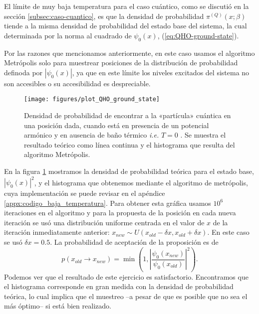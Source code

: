\documentclass[%
 reprint,
 amsmath,amssymb,
 aps,
 pra,
]{revtex4-2}
\begin{document}
El límite de muy baja temperatura para el caso cuántico, como se discutió en la sección \ref{subsec:caso-cuantico}, es que la densidad de probabilidad $\pi^{(Q)}(x;\beta)$ tiende a la misma densidad de probabilidad del estado base del sistema, la cual determinada por la norma al cuadrado de $\psi_0(x)$, (\ref{eq:QHO-ground-state}).

Por las razones que mencionamos anteriormente, en este caso usamos el algoritmo Metrópolis solo para muestrear posiciones de la distribución de probabilidad definoda por $|\psi_0(x)|$, ya que en este límite los niveles excitados del sistema no son accesibles o su accesibilidad es despreciable. 

\begin{figure}[!t]
	\centering
	\texttt{[image: figures/plot\_QHO\_ground\_state]}
	\caption{Densidad de probabilidad de encontrar a la «partícula» cuántica en una posición dada, cuando está en presencia de un potencial armónico y en ausencia de baño térmico \textit{i.e.} $T=0$ . Se muestra el resultado teórico como línea continua y el histograma que resulta del algoritmo Metrópolis.}
	\label{fig:ground_state}
\end{figure}

En la figura \ref{fig:ground_state} mostramos la densidad de probabilidad teórica para el estado base, $|\psi_0(x)|^2$, y el histograma que obtenemos mediante el algoritmo de metrópolis, cuya implementación se puede revisar en el apéndice \ref{appx:codigo_baja_temperatura}. Para obtener esta gráfica usamos $10^6$ iteraciones en el algoritmo y para la propuesta de la posición en cada nueva iteración se usó una distribución uniforme centrada en el valor de $x$ de la iteración inmediatamente anterior: $x_{new} \sim U(x_{old} - \delta x, x_{old} + \delta x)$. En este caso se usó $\delta x = 0.5$. La probabilidad de aceptación de la proposición es de
\begin{equation}
	p(x_{old} \rightarrow x_{new}) = \min\left(1,\left|\frac{\psi_{0}(x_{new})}{\psi_{0}(x_{old})}\right|^2\right).
\end{equation}
Podemos ver que el resultado de este ejercicio es satisfactorio. Encontramos que el histograma corresponde en gran medida con la densidad de probabilidad teórica, lo cual implica que el muestreo –a pesar de que es posible que no sea el más óptimo– si está bien realizado.
\end{document}
